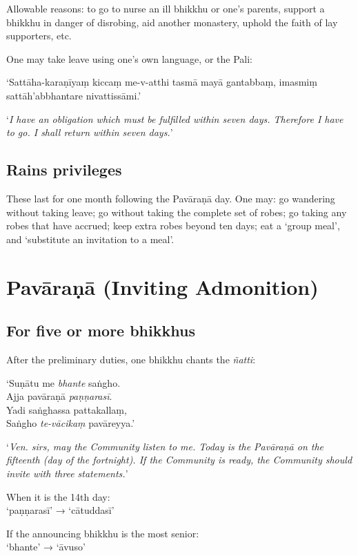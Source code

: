 Allowable reasons: to go to nurse an ill bhikkhu or one's parents, support a
bhikkhu in danger of disrobing, aid another monastery, uphold the faith of lay
supporters, etc.

One may take leave using one's own language, or the Pali:

‘Sattāha-karaṇīyaṃ kiccaṃ me-v-atthi tasmā mayā gantabbaṃ, imasmiṃ
sattāh'abbhantare nivattissāmi.’

‘\emph{I have an obligation which must be fulfilled within seven days. Therefore
  I have to go. I shall return within seven days.}’\\
\mbox{}

\subsection{Rains privileges}

These last for one month following the Pavāraṇā day. One may: go wandering
without taking leave; go without taking the complete set of robes; go taking any
robes that have accrued; keep extra robes beyond ten days; eat a ‘group meal’,
and ‘substitute an invitation to a meal’.

\section{Pavāraṇā (Inviting Admonition)}

\subsection{For five or more bhikkhus}

After the preliminary duties, one bhikkhu chants the \emph{ñatti}:

‘Suṇātu me \emph{bhante} saṅgho.\\
Ajja pavāraṇā \emph{paṇṇarasī}.\\
Yadi saṅghassa pattakallaṃ,\\
Saṅgho \emph{te-vācikaṃ} pavāreyya.’

‘\emph{Ven. sirs, may the Community listen to me. Today is the Pavāraṇā on the
  fifteenth (day of the fortnight). If the Community is ready, the Community
  should invite with three statements.}’


When it is the 14th day:\\
‘paṇṇarasī’ → ‘cātuddasī’

If the announcing bhikkhu is the most senior:\\
‘bhante’ → ‘āvuso’

